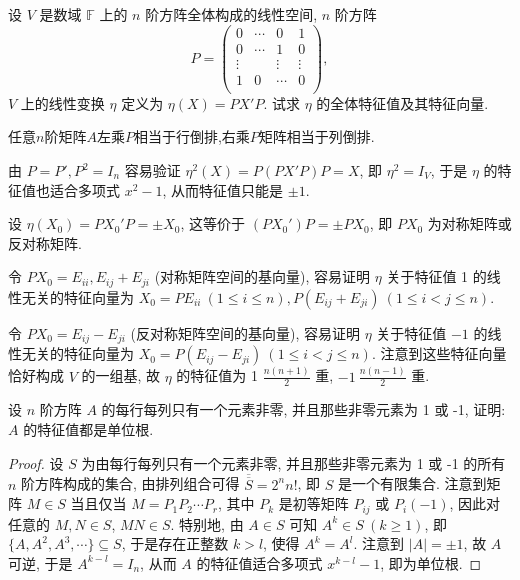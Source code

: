\documentclass[lang=cn,newtx,10pt,scheme=chinese]{elegantbook}
\begin{document}
\begin{example}
设 \( V \) 是数域 \( \mathbb{F} \) 上的 \( n \) 阶方阵全体构成的线性空间, \( n \) 阶方阵
\[
P=\left( \begin{matrix}
0&		\cdots&		0&		1\\
0&		\cdots&		1&		0\\
\vdots&		&		\vdots&		\vdots\\
1&		0&		\cdots&		0\\
\end{matrix} \right) ,
\]
\( V \) 上的线性变换 \( \eta \) 定义为 \( \eta(X) = PX'P \). 试求 \( \eta \) 的全体特征值及其特征向量.
\end{example}
\begin{note}
任意$n$阶矩阵$A$左乘$P$相当于行倒排,右乘$P$矩阵相当于列倒排.
\end{note}
\begin{solution}
由 \( P = P', P^2 = I_n \) 容易验证 \( \eta^2(X) = P(PX'P)P = X \), 即 \( \eta^2 = I_V \), 于是 \( \eta \) 的特征值也适合多项式 \( x^2 - 1 \), 从而特征值只能是 \( \pm 1 \).

设 \( \eta(X_0) = PX_0'P = \pm X_0 \), 这等价于 \( (PX_0')P = \pm PX_0 \), 即 \( PX_0 \) 为对称矩阵或反对称矩阵. 

令 \( PX_0 = E_{ii}, E_{ij} + E_{ji} \) (对称矩阵空间的基向量), 容易证明 \( \eta \) 关于特征值 1 的线性无关的特征向量为 \( X_0 = PE_{ii} \ (1 \leq i \leq n), P(E_{ij} + E_{ji}) \ (1 \leq i < j \leq n) \).

令 \( PX_0 = E_{ij} - E_{ji} \) (反对称矩阵空间的基向量), 容易证明 \( \eta \) 关于特征值 \( -1 \) 的线性无关的特征向量为 \( X_0 = P(E_{ij} - E_{ji}) \ (1 \leq i < j \leq n) \). 注意到这些特征向量恰好构成 \( V \) 的一组基, 故 \( \eta \) 的特征值为 1 \( \frac{n(n+1)}{2} \) 重, \( -1 \ \frac{n(n-1)}{2} \) 重.
\end{solution}

\begin{example}
设 \( n \) 阶方阵 \( A \) 的每行每列只有一个元素非零, 并且那些非零元素为 1 或 -1, 证明: \( A \) 的特征值都是单位根.
\end{example}
\begin{proof}
设 \( S \) 为由每行每列只有一个元素非零, 并且那些非零元素为 1 或 -1 的所有 \( n \) 阶方阵构成的集合, 由排列组合可得 \( \overline{\overline{S}} = 2^n n! \), 即 \( S \) 是一个有限集合. 注意到矩阵 \( M \in S \) 当且仅当 \( M = P_1 P_2 \cdots P_r \), 其中 \( P_k \) 是初等矩阵 \( P_{ij} \) 或 \( P_i(-1) \), 因此对任意的 \( M, N \in S \), \( MN \in S \). 特别地, 由 \( A \in S \) 可知 \( A^k \in S \ (k \geq 1) \), 即 \( \{A, A^2, A^3, \cdots\} \subseteq S \), 于是存在正整数 \( k > l \), 使得 \( A^k = A^l \). 注意到 \( |A| = \pm 1 \), 故 \( A \) 可逆, 于是 \( A^{k-l} = I_n \), 从而 \( A \) 的特征值适合多项式 \( x^{k-l} - 1 \), 即为单位根.
\end{proof}
\end{document}
